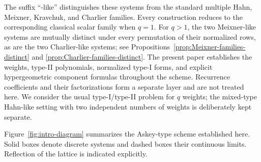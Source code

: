 \documentclass[10pt]{amsart}
\theoremstyle{plain}
\theoremstyle{definition}
\theoremstyle{remark}
\begin{document}
The suffix ``-like'' distinguishes these systems from the standard
multiple Hahn, Meixner, Kravchuk, and Charlier families. Every
construction reduces to the corresponding classical scalar family when
\(q=1\). For \(q>1\), the two Meixner-like systems are mutually distinct
under every permutation of their normalized rows, as are the two
Charlier-like systems; see
Propositions~\ref{prop:Meixner-families-distinct} and
\ref{prop:Charlier-families-distinct}. The present paper establishes the
weights, type-II polynomials, normalized type-I forms, and explicit
hypergeometric component formulas throughout the scheme. Recurrence
coefficients and their factorizations form a separate layer and are not
treated here. We consider the usual type-I/type-II problem for \(q\)
weights; the mixed-type Hahn-like setting with two independent numbers of
weights is deliberately kept separate.

Figure~\ref{fig:intro-diagram} summarizes the Askey-type scheme
established here. Solid boxes denote discrete systems and dashed boxes
their continuous limits. Reflection of the lattice is indicated
explicitly.
\end{document}
